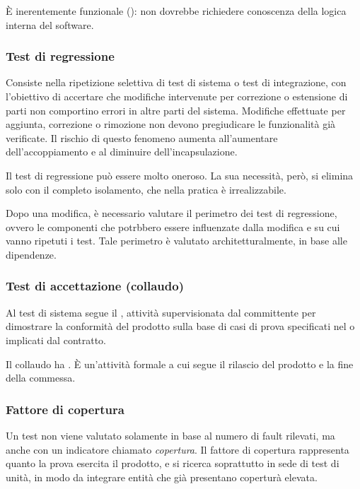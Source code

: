 \`E inerentemente funzionale (): non dovrebbe richiedere
conoscenza della logica interna del software.

\subsubsection{Test di regressione}
\label{ssub:test_di_regressione}

Consiste nella ripetizione selettiva di test di sistema o test di integrazione,
con l'obiettivo di accertare che modifiche intervenute per correzione o
estensione di parti non comportino errori in altre parti del sistema.
Modifiche effettuate per aggiunta, correzione o rimozione non devono
pregiudicare le funzionalità già verificate. Il rischio di questo fenomeno
aumenta all'aumentare dell'accoppiamento e al diminuire dell'incapsulazione.

Il test di regressione può essere molto oneroso. La sua necessità, però, si
elimina solo con il completo isolamento, che nella pratica è irrealizzabile.

Dopo una modifica, è necessario valutare il perimetro dei test di regressione,
ovvero le componenti che potrbbero essere influenzate dalla modifica e su cui
vanno ripetuti i test. Tale perimetro è valutato architetturalmente, in base
alle dipendenze.

\subsubsection{Test di accettazione (collaudo)}
\label{ssub:test_di_accettazione}

Al test di sistema segue il , attività supervisionata dal
committente per dimostrare la conformità del prodotto sulla base di casi di
prova specificati nel o implicati dal contratto.

Il collaudo ha . \`E un'attività formale a cui
segue il rilascio del prodotto e la fine della commessa.

\subsubsection{Fattore di copertura}
\label{ssub:fattore_di_copertura}

Un test non viene valutato solamente in base al numero di fault rilevati, ma
anche con un indicatore chiamato \emph{copertura}. Il fattore di copertura
rappresenta quanto la prova esercita il prodotto, e si ricerca soprattutto in
sede di test di unità, in modo da integrare entità che già presentano coperturà
elevata.

